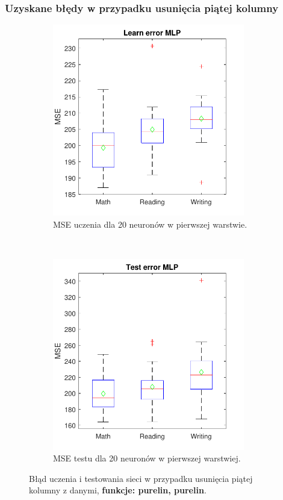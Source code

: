\documentclass[12pt]{article}
\begin{document}
\subsubsection{Uzyskane błędy w przypadku usunięcia piątej kolumny}
\begin{figure}[H]
\centering
\begin{subfigure}[t]{0.48\textwidth} 
\centering
\includegraphics[height=3.3in]{purelin_purelin_20_without_5_learnBoxplot.pdf}
\caption{MSE uczenia dla  20 neuronów w pierwszej warstwie.}
\end{subfigure}
~~
\begin{subfigure}[t]{0.48\textwidth} 
\centering
\includegraphics[height=3.3in]{purelin_purelin_20_without_5_testBoxplot.pdf}
\caption{MSE testu dla  20  neuronów w pierwszej warstwiej.}
\end{subfigure}

\caption{Błąd uczenia i testowania sieci w przypadku usunięcia piątej  kolumny z danymi, \textbf{funkcje: purelin, purelin}.}
\end{figure}
\end{document}
